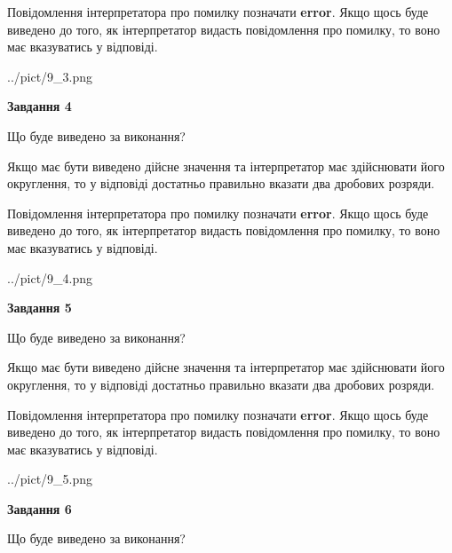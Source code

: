 \documentclass[12pt, ukrainian]{article}
\begin{document}
{\begin {Large}
Повідомлення інтерпретатора про помилку позначати \textbf{error}.
Якщо щось буде виведено до того, як інтерпретатор видасть повідомлення про помилку, 
то воно має вказуватись у відповіді. \par

\begin{center}
	{../pict/9_3.png}
\end{center}
\newpage

{\begin {center}\textbf{Завдання 4}\end {center}}\par
Що буде виведено за виконання? \par

Якщо має бути виведено дійсне значення та інтерпретатор має здійснювати його округлення, 
то у відповіді достатньо правильно вказати два дробових розряди.

Повідомлення інтерпретатора про помилку позначати \textbf{error}.
Якщо щось буде виведено до того, як інтерпретатор видасть повідомлення про помилку, 
то воно має вказуватись у відповіді. \par

\begin{center}
	{../pict/9_4.png}
\end{center}
\newpage

{\begin {center}\textbf{Завдання 5}\end {center}}\par
Що буде виведено за виконання? \par

Якщо має бути виведено дійсне значення та інтерпретатор має здійснювати його округлення, 
то у відповіді достатньо правильно вказати два дробових розряди.

Повідомлення інтерпретатора про помилку позначати \textbf{error}.
Якщо щось буде виведено до того, як інтерпретатор видасть повідомлення про помилку, 
то воно має вказуватись у відповіді. \par

\begin{center}
	{../pict/9_5.png}
\end{center}
\newpage

{\begin {center}\textbf{Завдання 6}\end {center}}\par
Що буде виведено за виконання? \par


\end{Large}}
\end{document}
